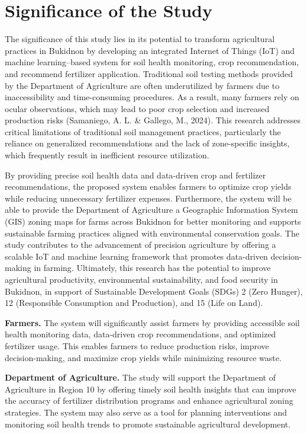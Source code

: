 {	\section{Significance of the Study}
	
	The significance of this study lies in its potential to transform agricultural practices in Bukidnon by developing an integrated Internet of Things (IoT) and machine learning–based system for soil health monitoring, crop recommendation, and recommend fertilizer application. Traditional soil testing methods provided by the Department of Agriculture are often underutilized by farmers due to inaccessibility and time-consuming procedures. As a result, many farmers rely on ocular observations, which may lead to poor crop selection and increased production risks (Samaniego, A. L. \& Gallego, M., 2024). This research addresses critical limitations of traditional soil management practices, particularly the reliance on generalized recommendations and the lack of zone-specific insights, which frequently result in inefficient resource utilization.
	
	By providing precise soil health data and data-driven crop and fertilizer recommendations, the proposed system enables farmers to optimize crop yields while reducing unnecessary fertilizer expenses. Furthermore, the system will be able to provide the Department of Agriculture a Geographic Information System (GIS) zoning maps for farms across Bukidnon for better monitoring and supports sustainable farming practices aligned with environmental conservation goals. The study contributes to the advancement of precision agriculture by offering a scalable IoT and machine learning framework that promotes data-driven decision-making in farming. Ultimately, this research has the potential to improve agricultural productivity, environmental sustainability, and food security in Bukidnon, in support of Sustainable Development Goals (SDGs) 2 (Zero Hunger), 12 (Responsible Consumption and Production), and 15 (Life on Land).
	
	\textbf{Farmers.}
	The system will significantly assist farmers by providing accessible soil health monitoring data, data-driven crop recommendations, and optimized fertilizer usage. This enables farmers to reduce production risks, improve decision-making, and maximize crop yields while minimizing resource waste.
	
	\textbf{Department of Agriculture.}
	The study will support the Department of Agriculture in Region 10 by offering timely soil health insights that can improve the accuracy of fertilizer distribution programs and enhance agricultural zoning strategies. The system may also serve as a tool for planning interventions and monitoring soil health trends to promote sustainable agricultural development.
	
}
